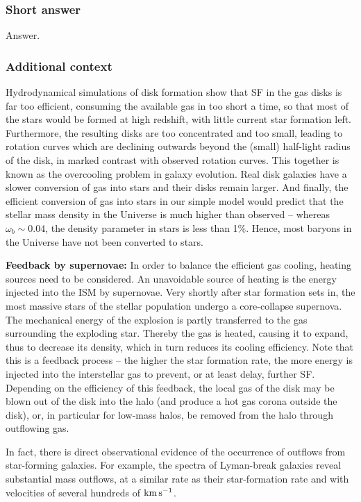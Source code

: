 \documentclass[a4paper,11pt]{article}
\begin{document}
\subsubsection{Short answer}

Answer.

\subsubsection{Additional context}

Hydrodynamical simulations of disk formation show that SF in the gas disks is far too efficient, consuming the available gas in too short a time, so that most of the stars would be formed at high redshift, with little current star formation left. Furthermore, the resulting disks are too concentrated and too small, leading to rotation curves which are declining outwards beyond the (small) half-light radius of the disk, in marked contrast with observed rotation curves. This together is known as the overcooling problem in galaxy evolution. Real disk galaxies have a slower conversion of gas into stars and their disks remain larger. And finally, the efficient conversion of gas into stars in our simple model would predict that the stellar mass density in the Universe is much higher than observed -- whereas $\omega_b\sim0.04$, the density parameter in stars is less than 1\%. Hence, most baryons in the Universe have not been converted to stars.

{\noindent}\textbf{Feedback by supernovae:} In order to balance the efficient gas cooling, heating sources need to be considered. An unavoidable source of heating is the energy injected into the ISM by supernovae. Very shortly after star formation sets in, the most massive stars of the stellar population undergo a core-collapse supernova. The mechanical energy of the explosion is partly transferred to the gas surrounding the exploding star. Thereby the gas is heated, causing it to expand, thus to decrease its density, which in turn reduces its cooling efficiency. Note that this is a feedback process -- the higher the star formation rate, the more energy is injected into the interstellar gas to prevent, or at least delay, further SF. Depending on the efficiency of this feedback, the local gas of the disk may be blown out of the disk into the halo (and produce a hot gas corona outside the disk), or, in particular for low-mass halos, be removed from the halo through outflowing gas.

{\noindent}In fact, there is direct observational evidence of the occurrence of outflows from star-forming galaxies. For example, the spectra of Lyman-break galaxies reveal substantial mass outflows, at a similar rate as their star-formation rate and with velocities of several hundreds of ${\rm km\,s^{-1}}$.
\end{document}

